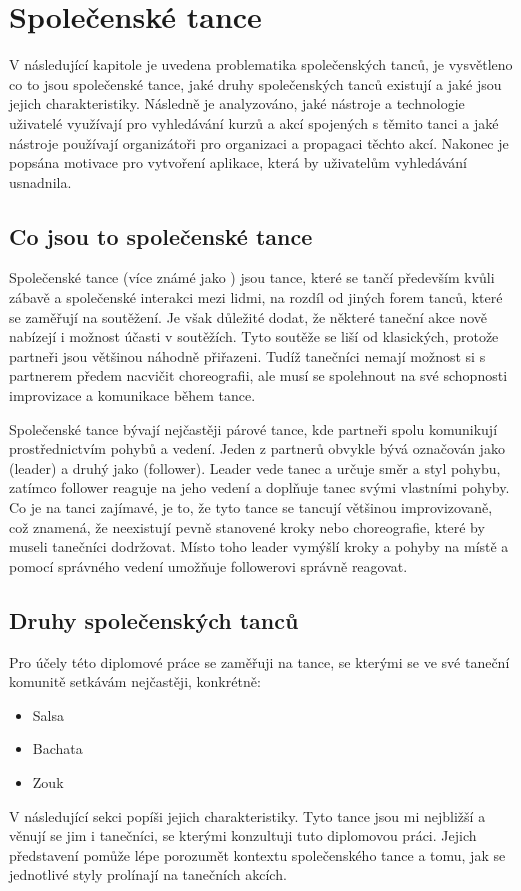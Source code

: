 \chapter{Společenské tance}
\begin{chapterabstract}
	V následující kapitole je uvedena problematika společenských tanců, je vysvětleno co to jsou společenské tance, jaké druhy společenských tanců existují a jaké jsou jejich charakteristiky. Následně je analyzováno, jaké nástroje a technologie uživatelé využívají pro vyhledávání kurzů a akcí spojených s těmito tanci a jaké nástroje používají organizátoři pro organizaci a propagaci těchto akcí. 
    Nakonec je popsána motivace pro vytvoření aplikace, která by uživatelům vyhledávání usnadnila. 
\end{chapterabstract}
\section{Co jsou to společenské tance}
Společenské tance (více známé jako ) jsou tance, které se tančí především kvůli zábavě a společenské interakci mezi lidmi, na rozdíl od jiných forem tanců, které se zaměřují na soutěžení. Je však důležité dodat, že některé taneční akce nově nabízejí i možnost účasti v soutěžích. Tyto soutěže se liší od klasických, protože partneři jsou většinou náhodně přiřazeni. Tudíž tanečníci nemají možnost si s partnerem předem nacvičit choreografii, ale musí se spolehnout na své schopnosti improvizace a komunikace během tance.
\cite{socialDance:about}

Společenské tance bývají nejčastěji párové tance, kde partneři spolu komunikují prostřednictvím pohybů a vedení. Jeden z partnerů obvykle bývá označován jako  (leader) a druhý jako  (follower). Leader vede tanec a určuje směr a styl pohybu, zatímco follower reaguje na jeho vedení a doplňuje tanec svými vlastními pohyby. Co je na tanci zajímavé, je to, že tyto tance se tancují většinou improvizovaně, což znamená, že neexistují pevně stanovené kroky nebo choreografie, které by museli tanečníci dodržovat. Místo toho leader vymýšlí kroky a pohyby na místě a pomocí správného vedení umožňuje followerovi správně reagovat. 
 \cite{socialDance:about}

\section{Druhy společenských tanců} \label{sec:tanecni-styly}
Pro účely této diplomové práce se zaměřuji na tance, se kterými se ve své taneční komunitě setkávám nejčastěji, konkrétně:
\begin{itemize}
    \item Salsa
    \item Bachata
    \item Zouk
\end{itemize}
V následující sekci popíši jejich charakteristiky. Tyto tance jsou mi nejbližší a věnují se jim i tanečníci, se kterými konzultuji tuto diplomovou práci. Jejich představení pomůže lépe porozumět kontextu společenského tance a tomu, jak se jednotlivé styly prolínají na tanečních akcích.

